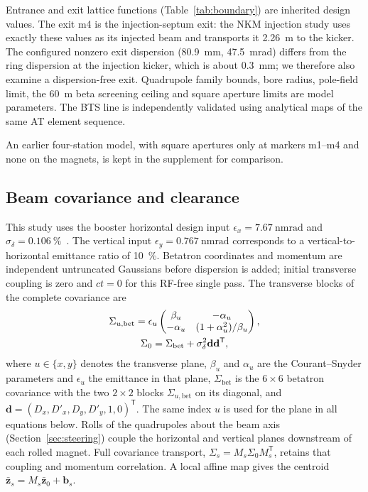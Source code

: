 \documentclass[final,5p,twocolumn]{elsarticle}
\newcommand{\BtsEquationPair}[2]{%
\ifdefined\BtsTwoColumn\begin{gathered}#1\\#2\end{gathered}%
\else#1\qquad#2\fi}
\begin{document}
Entrance and exit lattice functions (Table~\ref{tab:boundary}) are inherited design
values. The exit m4 is the injection-septum exit: the NKM injection study uses
exactly these values as its injected beam and transports it \SI{2.26}{\metre} to the kicker.
The configured nonzero exit dispersion (\SI{80.9}{\milli\metre}, \SI{47.5}{\milli\radian}) differs from the ring dispersion at the injection kicker, which is about \SI{0.3}{\milli\metre};
we therefore also examine a dispersion-free exit. Quadrupole family bounds, bore radius, pole-field limit, the \SI{60}{\metre}
beta screening ceiling and square aperture limits are model parameters.
The BTS line is independently validated using analytical maps of the same AT
element sequence.

An earlier four-station model, with square apertures only at markers m1--m4 and none
on the magnets, is kept in the supplement for comparison.

\subsection{Beam covariance and clearance}
This study uses the booster horizontal design input $\epsilon_x=\SI{7.67}{\nano\metre\radian}$
and $\sigma_\delta=\SI{0.106}{\percent}$~\cite{Lee2024}. The vertical input
$\epsilon_y=\SI{0.767}{\nano\metre\radian}$ corresponds to a vertical-to-horizontal
emittance ratio of \SI{10}{\percent}. Betatron coordinates and
momentum are independent untruncated Gaussians before dispersion is added;
initial transverse coupling is zero and $ct=0$ for this RF-free single pass.
The transverse blocks of the complete covariance are
\begin{equation}
 \BtsEquationPair{\Sigma_{u,\mathrm{bet}}=\epsilon_u
 \begin{pmatrix}\beta_u&-\alpha_u\\-\alpha_u&(1+\alpha_u^2)/\beta_u\end{pmatrix},}
 {\Sigma_0=\Sigma_{\mathrm{bet}}+\sigma_\delta^2\mathbf d\mathbf d^{\mathsf T},}
\end{equation}
where $u\in\{x,y\}$ denotes the transverse plane, $\beta_u$ and $\alpha_u$ are the
Courant--Snyder parameters and $\epsilon_u$ the emittance in that plane,
$\Sigma_{\mathrm{bet}}$ is the $6\times6$ betatron covariance with the two
$2\times2$ blocks $\Sigma_{u,\mathrm{bet}}$ on its diagonal, and
$\mathbf d=(D_x,D'_x,D_y,D'_y,1,0)^{\mathsf T}$. The same index $u$ is used for the
plane in all equations below. Rolls of the quadrupoles about the beam axis
(Section~\ref{sec:steering}) couple the horizontal and vertical planes downstream
of each rolled magnet. Full covariance transport, $\Sigma_s=M_s\Sigma_0M_s^{\mathsf T}$,
retains that coupling and momentum correlation. A local affine map gives the
centroid $\bar{\mathbf z}_s=M_s\bar{\mathbf z}_0+\mathbf b_s$.
\end{document}
